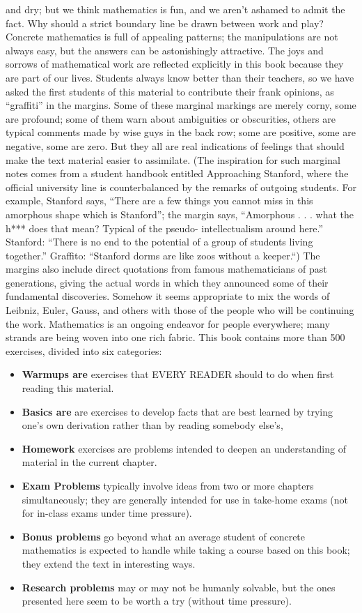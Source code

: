 \documentclass[a4paper]{article}
\begin{document}
and dry; but we think mathematics is fun, and we aren't ashamed to admit
the fact. Why should a strict boundary line be drawn between work and
play? Concrete mathematics is full of appealing patterns; the manipulations
are not always easy, but the answers can be astonishingly attractive. The
joys and sorrows of mathematical work are reflected explicitly in this book
because they are part of our lives.
Students always know better than their teachers, so we have asked the
first students of this material to contribute their frank opinions, as ``graffiti''
in the margins. Some of these marginal markings are merely corny, some
are profound; some of them warn about ambiguities or obscurities, others
are typical comments made by wise guys in the back row; some are positive,
some are negative, some are zero. But they all are real indications of feelings
that should make the text material easier to assimilate. (The inspiration for
such marginal notes comes from a student handbook entitled Approaching
Stanford, where the official university line is counterbalanced by the remarks
of outgoing students. For example, Stanford says, ``There are a few things
you cannot miss in this amorphous shape which is Stanford''; the margin
says, ``Amorphous . . . what the h*** does that mean? Typical of the pseudo-
intellectualism around here.'' Stanford: ``There is no end to the potential of
a group of students living together.'' Graffito: ``Stanford dorms are like zoos
without a keeper.``)
The margins also include direct quotations from famous mathematicians
of past generations, giving the actual words in which they announced some
of their fundamental discoveries. Somehow it seems appropriate to mix the
words of Leibniz, Euler, Gauss, and others with those of the people who
will be continuing the work. Mathematics is an ongoing endeavor for people
everywhere; many strands are being woven into one rich fabric.
This book contains more than 500 exercises, divided into six categories:
\begin{itemize}
\item \textbf{Warmups are} exercises that EVERY READER should to do when first reading this material.
\item \textbf{Basics are} are exercises to develop facts that are best learned by trying one's own derivation rather than by reading somebody else's,
\item \textbf{Homework}  exercises are problems intended to deepen an understanding of material in the current chapter.
\item \textbf{Exam Problems} typically involve ideas from two or more chapters simultaneously; they are generally intended for use in take-home exams (not for in-class exams under time pressure).
\item \textbf{Bonus problems} go beyond what an average student of concrete mathematics is expected to handle while taking a course based on this book;
they extend the text in interesting ways.
\item \textbf{Research problems} may or may not be humanly solvable, but the ones
presented here seem to be worth a try (without time pressure).
\end{itemize}
\end{document}
